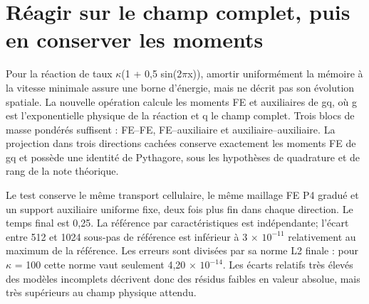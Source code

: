 \documentclass[10pt,a4paper]{article}
\begin{document}
\section{Réagir sur le champ complet, puis en conserver les moments}
Pour la réaction de taux \ensuremath{\kappa}(1 + 0,5 sin(2\(\pi\)x)), amortir uniformément la mémoire à la vitesse minimale assure une borne d'énergie, mais ne décrit pas son évolution spatiale. La nouvelle opération calcule les moments FE et auxiliaires de gq, où g est l'exponentielle physique de la réaction et q le champ complet. Trois blocs de masse pondérés suffisent : FE–FE, FE–auxiliaire et auxiliaire–auxiliaire. La projection dans trois directions cachées conserve exactement les moments FE de gq et possède une identité de Pythagore, sous les hypothèses de quadrature et de rang de la note théorique.

Le test conserve le même transport cellulaire, le même maillage FE P4 gradué et un support auxiliaire uniforme fixe, deux fois plus fin dans chaque direction. Le temps final est 0,25. La référence par caractéristiques est indépendante; l'écart entre 512 et 1024 sous-pas de référence est inférieur à 3 \(\times\) \(10^{-11}\) relativement au maximum de la référence. Les erreurs sont divisées par sa norme L2 finale : pour \ensuremath{\kappa} = 100 cette norme vaut seulement 4,20 \(\times\) \(10^{-14}\). Les écarts relatifs très élevés des modèles incomplets décrivent donc des résidus faibles en valeur absolue, mais très supérieurs au champ physique attendu.
\end{document}
